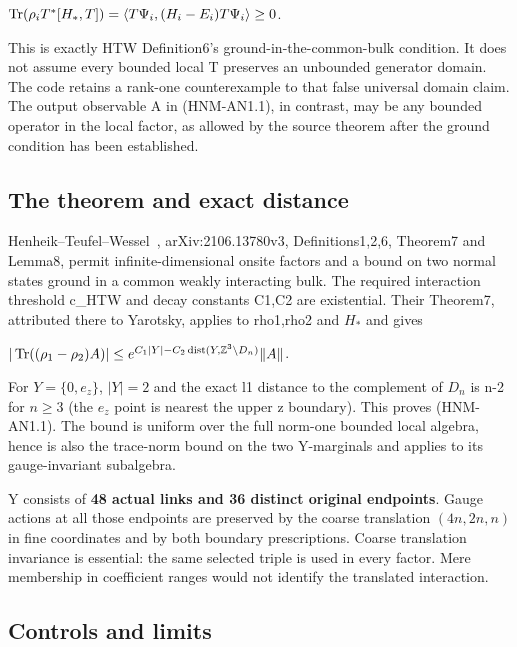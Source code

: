 \(\operatorname{Tr}(\rho_iT^*[H_*,T])=\langle T\Psi_i,(H_i-E_i)T\Psi_i\rangle\ge0\).

This is exactly HTW Definition6's ground-in-the-common-bulk condition. It does not assume every bounded local T preserves an unbounded generator domain. The code retains a rank-one counterexample to that false universal domain claim. The output observable A in (HNM-AN1.1), in contrast, may be any bounded operator in the local factor, as allowed by the source theorem after the ground condition has been established.

\hypertarget{r29-an1-the-theorem-and-exact-distance}{%
\subsection{The theorem and exact distance}\label{r29:an1:r29-an1-the-theorem-and-exact-distance}}

Henheik--Teufel--Wessel~\citep{henheik2022local}, arXiv:2106.13780v3, Definitions1,2,6, Theorem7 and Lemma8, permit infinite-dimensional onsite factors and a bound on two normal states ground in a common weakly interacting bulk. The required interaction threshold c\_HTW and decay constants C1,C2 are existential. Their Theorem7, attributed there to Yarotsky, applies to rho1,rho2 and \(H_*\) and gives

\(|\operatorname{Tr}((\rho_1-\rho_2)A)|\le e^{C_1|Y|-C_2\operatorname{dist}(Y,\mathbb Z^3\setminus D_n)}\|A\|\).

For \(Y=\{0,e_z\}\), \(|Y|=2\) and the exact l1 distance to the complement of \(D_n\) is n-2 for \(n\ge 3\) (the \(e_z\) point is nearest the upper z boundary). This proves (HNM-AN1.1). The bound is uniform over the full norm-one bounded local algebra, hence is also the trace-norm bound on the two Y-marginals and applies to its gauge-invariant subalgebra.

Y consists of \textbf{48 actual links and 36 distinct original endpoints}. Gauge actions at all those endpoints are preserved by the coarse translation \((4n,2n,n)\) in fine coordinates and by both boundary prescriptions. Coarse translation invariance is essential: the same selected triple is used in every factor. Mere membership in coefficient ranges would not identify the translated interaction.

\hypertarget{r29-an1-controls-and-limits}{%
\subsection{Controls and limits}\label{r29:an1:r29-an1-controls-and-limits}}

